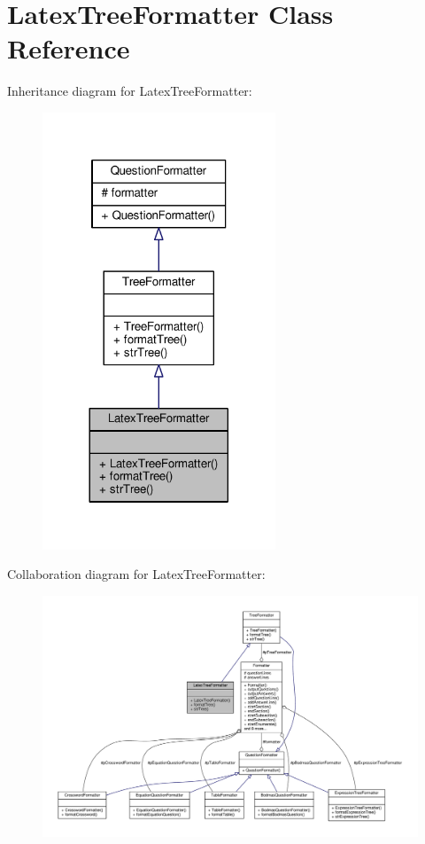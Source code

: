 \hypertarget{classLatexTreeFormatter}{}\section{Latex\+Tree\+Formatter Class Reference}
\label{classLatexTreeFormatter}


Inheritance diagram for Latex\+Tree\+Formatter\+:
\nopagebreak
\begin{figure}[H]
\begin{center}
\leavevmode
\includegraphics[width=197pt]{classLatexTreeFormatter__inherit__graph}
\end{center}
\end{figure}


Collaboration diagram for Latex\+Tree\+Formatter\+:
\nopagebreak
\begin{figure}[H]
\begin{center}
\leavevmode
\includegraphics[width=350pt]{classLatexTreeFormatter__coll__graph}
\end{center}
\end{figure}
